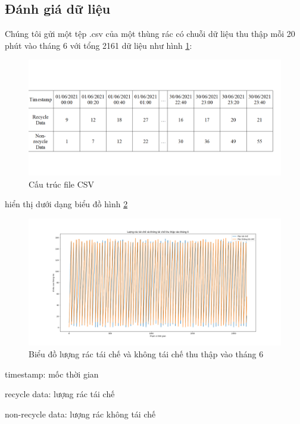 \subsection{Đánh giá dữ liệu}
Chúng tôi gửi một tệp .csv của một thùng rác có chuỗi dữ liệu thu thập mỗi 20 phút vào tháng 6 với tổng 2161 dữ liệu như hình \ref{tab:CSV_structure}:
\begin{figure}[H]
    \centering
    \includegraphics[width=\textwidth]{images/Khanh/Python/CSV_Structure.PNG}
    \caption{Cấu trúc file CSV}
    \label{tab:CSV_structure}
\end{figure}

hiển thị dưới dạng biểu đồ hình \ref{fig:CSV_plot_chart}
\begin{figure}[H]
    \centering
    \includegraphics[width=\textwidth]{images/Khanh/Python/CSV_Plot_Chart.png}
    \caption{Biểu đồ lượng rác tái chế và không tái chế thu thập vào tháng 6}
    \label{fig:CSV_plot_chart}
\end{figure}

\begin{description}
    \item timestamp: mốc thời gian
    \item recycle data: lượng rác tái chế
    \item non-recycle data: lượng rác không tái chế
\end{description}

